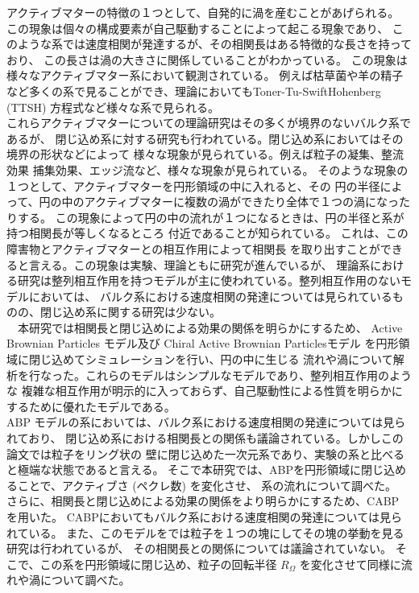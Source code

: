 \documentclass[/Users/ikedahajime/GitHub/reserch/master_report/thesis]{subfiles}
\begin{document}
アクティブマターの特徴の１つとして、自発的に渦を産むことがあげられる。
この現象は個々の構成要素が自己駆動することによって起こる現象であり、
このような系では速度相関が発達するが、その相関長はある特徴的な長さを持っており、
この長さは渦の大きさに関係していることがわかっている。
この現象は様々なアクティブマター系において観測されている。
例えば枯草菌\cite{wensinkMesoscaleTurbulenceLiving2012}や羊の精子\cite{creppyTurbulenceSwarmingSperm2015}
など多くの系で見ることができ、理論においてもToner-Tu-SwiftHohenberg (TTSH) 方程式など\cite{wensinkMesoscaleTurbulenceLiving2012}様々な系で見られる。%
\\
これらアクティブマターについての理論研究はその多くが境界のないバルク系であるが、
閉じ込め系に対する研究も行われている。閉じ込め系においてはその境界の形状などによって
様々な現象が見られている。例えば粒子の凝集、整流効果\cite{ghoshSelfPropelledJanusParticles2013}
捕集効果、エッジ流など、様々な現象が見られている。
そのような現象の１つとして、アクティブマターを円形領域の中に入れると、その
円の半径によって、円の中のアクティブマターに複数の渦ができたり全体で１つの渦になったりする。
この現象によって円の中の流れが１つになるときは、円の半径と系が持つ相関長が等しくなるところ
付近であることが知られている。
これは、この障害物とアクティブマターとの相互作用によって相関長
を取り出すことができると言える。この現象は実験、理論ともに研究が進んでいるが、
理論系における研究は整列相互作用を持つモデルが主に使われている。整列相互作用のないモデルにおいては、
バルク系における速度相関の発達については見られているものの、閉じ込め系に関する研究は少ない。\\
　本研究では相関長と閉じ込めによる効果の関係を明らかにするため、
Active Brownian Particles モデル及び Chiral Active Brownian Particlesモデル
を円形領域に閉じ込めてシミュレーションを行い、円の中に生じる
流れや渦について解析を行なった。これらのモデルはシンプルなモデルであり、整列相互作用のような
複雑な相互作用が明示的に入っておらず、自己駆動性による性質を明らかにするために優れたモデルである。\\
ABP モデルの系においては、バルク系における速度相関の発達については見られており、
閉じ込め系における相関長との関係も議論されている。しかしこの論文では粒子をリング状の
壁に閉じ込めた一次元系であり、実験の系と比べると極端な状態であると言える。
そこで本研究では、ABPを円形領域に閉じ込めることで、アクティブさ (ペクレ数) を変化させ、
系の流れについて調べた。\\
さらに、相関長と閉じ込めによる効果の関係をより明らかにするため、CABP を用いた。
CABPにおいてもバルク系における速度相関の発達については見られている。
また、このモデルをでは粒子を１つの塊にしてその塊の挙動を見る研究は行われているが、
その相関長との関係については議論されていない。
そこで、この系を円形領域に閉じ込め、粒子の回転半径 $R_\Omega$ を変化させて同様に流れや渦について調べた。
\end{document}
